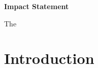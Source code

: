 \documentclass[lineno,authoryear]{FLO_v1}%
\theoremstyle{definition}
\begin{document}
\maketitle

\begin{boxtext}

\textbf{Impact Statement}

The

\end{boxtext}

\section{Introduction}
\end{document}
